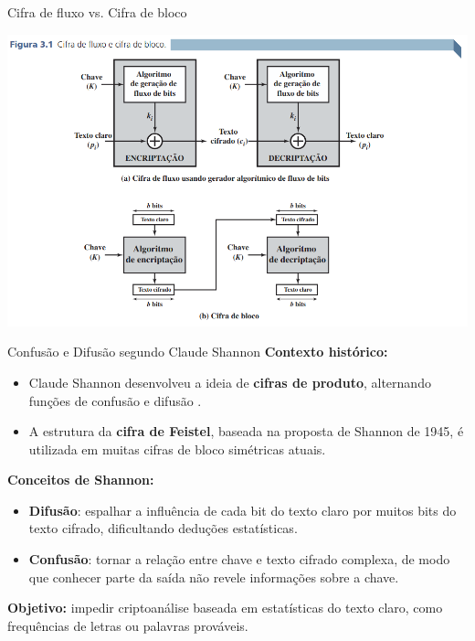 \begin{frame}{Cifra de fluxo vs. Cifra de bloco}

\centering
\includegraphics[width=0.9\linewidth]{Figuras/cifra-de-bloco-cifra-de-fluxo.png}


\end{frame}


\begin{frame}{Confusão e Difusão segundo Claude Shannon}
\textbf{Contexto histórico:}
\begin{itemize}
    \item Claude Shannon desenvolveu a ideia de \textbf{cifras de produto}, alternando funções de confusão e difusão \cite{SHAN49}.
    \item A estrutura da \textbf{cifra de Feistel}, baseada na proposta de Shannon de 1945, é utilizada em muitas cifras de bloco simétricas atuais.
\end{itemize}

\medskip
\textbf{Conceitos de Shannon:}
\begin{itemize}
    \item \textbf{Difusão}: espalhar a influência de cada bit do texto claro por muitos bits do texto cifrado, dificultando deduções estatísticas.
    \item \textbf{Confusão}: tornar a relação entre chave e texto cifrado complexa, de modo que conhecer parte da saída não revele informações sobre a chave.
\end{itemize}

\medskip
\textbf{Objetivo:} impedir criptoanálise baseada em estatísticas do texto claro, como frequências de letras ou palavras prováveis.
\end{frame}

